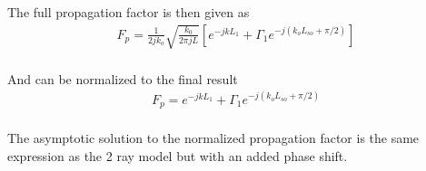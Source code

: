 The full propagation factor is then given as
\begin{equation}
\begin{gathered}
F_p= \frac{1}{2jk_o}\sqrt{\frac{k_0}{2\pi jL}}\left[e^{-jkL_1} + \Gamma_1e^{-j\left(k_oL_{so}+\pi/2\right)}\right] \\
\end{gathered}
\label{mp_eq:27b}
\end{equation}

And can be normalized to the final result
\begin{equation}
\begin{gathered}
\boxed{F_p= e^{-jkL_1} + \Gamma_1e^{-j\left(k_oL_{so}+\pi/2\right)}} \\
\end{gathered}
\label{mp_eq:28}
\end{equation}

The asymptotic solution to the normalized propagation factor is the same expression as the 2 ray model but with an added phase shift.